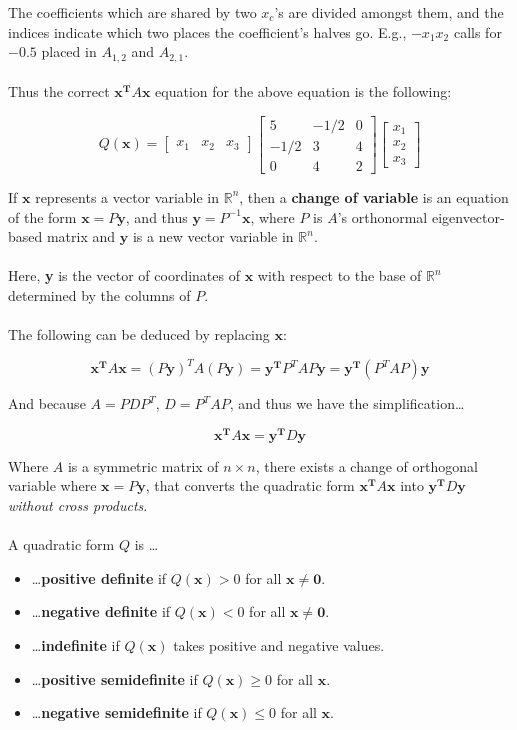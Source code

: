 \documentclass[12pt]{article}
\newcommand{\R}{\mathbb{R}}
\newcommand{\bt}[1]{\textbf{{#1}}}
\newcommand{\bm}[1]{\mathbf{{#1}}}
\newcommand{\mb}{\begin{bmatrix}}
\newcommand{\me}{\end{bmatrix}}
\begin{document}
The coefficients which are shared by two $x_c$'s are divided amongst them, and the indices
indicate which two places the coefficient's halves go. E.g., $-x_1x_2$
calls for $-0.5$ placed in $A_{1,2}$ and $A_{2,1}$. \\ \\

Thus the correct $\bm{x^T}A\bm{x}$ equation for the above equation is the following:

$$Q(\bm{x}) = \mb x_1 & x_2 & x_3 \me 
\mb 5 & -1/2 & 0 \\ -1/2 & 3 & 4 \\ 0 & 4 & 2 \me 
\mb x_1 \\ x_2 \\ x_3 \me$$

If $\bm{x}$ represents a vector variable in $\R^n$, then a \bt{change of variable}
is an equation of the form $\bm{x} = P\bm{y}$, and thus $\bm{y} = P^{-1}\bm{x}$, where $P$ is $A$'s orthonormal eigenvector-based matrix and $\bm{y}$ is a new vector variable in $\R^n$. \\ \\

Here, \bt{y} is the vector of coordinates of $\bm{x}$ with respect to the base of $\R^n$ determined by
the columns of $P$. \\ \\

The following can be deduced by replacing $\bm{x}$:

$$\bm{x^T}A\bm{x} = (P\bm{y})^T A(P\bm{y}) = \bm{y^T}P^TAP\bm{y} = \bm{y^T}(P^TAP)\bm{y}$$

And because $A = PDP^T$, $D = P^TAP$, and thus we have the simplification\dots

$$\bm{x^T}A\bm{x} = \bm{y^T}D\bm{y}$$

Where $A$ is a symmetric matrix of $n \times n$, there exists a change of orthogonal variable
where $\bm{x} = P\bm{y}$, that converts the quadratic form $\bm{x^T}A\bm{x}$ into $\bm{y^T}D\bm{y}$ 
\emph{without cross products}. \\ \\

A quadratic form $Q$ is \dots

\begin{itemize}
    \item \dots\bt{positive definite} if $Q(\bm{x}) > 0$ for all $\bm{x} \neq \bm{0}$.
    \item \dots\bt{negative definite} if $Q(\bm{x}) < 0$ for all $\bm{x} \neq \bm{0}$.
    \item \dots\bt{indefinite} if $Q(\bm{x})$ takes positive and negative values.
    \item \dots\bt{positive semidefinite} if $Q(\bm{x}) \geq 0$ for all $\bm{x}$.
    \item \dots\bt{negative semidefinite} if $Q(\bm{x}) \leq 0$ for all $\bm{x}$.
\end{itemize}
\end{document}
